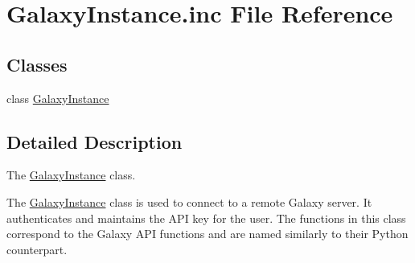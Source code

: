 \hypertarget{GalaxyInstance_8inc}{}\section{Galaxy\+Instance.\+inc File Reference}
\label{GalaxyInstance_8inc}
\subsection*{Classes}
\begin{DoxyCompactItemize}
\item 
class \hyperlink{classGalaxyInstance}{Galaxy\+Instance}
\end{DoxyCompactItemize}


\subsection{Detailed Description}
The \hyperlink{classGalaxyInstance}{Galaxy\+Instance} class.

The \hyperlink{classGalaxyInstance}{Galaxy\+Instance} class is used to connect to a remote Galaxy server. It authenticates and maintains the A\+PI key for the user. The functions in this class correspond to the Galaxy A\+PI functions and are named similarly to their Python counterpart. 